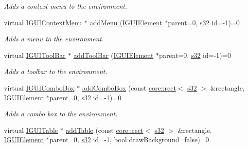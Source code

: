 \begin{DoxyCompactItemize}
\begin{DoxyCompactList}\small\item\em Adds a context menu to the environment. \end{DoxyCompactList}\item 
virtual \hyperlink{classirr_1_1gui_1_1IGUIContextMenu}{I\+G\+U\+I\+Context\+Menu} $\ast$ \hyperlink{classirr_1_1gui_1_1IGUIEnvironment_a0bed2ddf6c422117285f9602c8afd4a1}{add\+Menu} (\hyperlink{classirr_1_1gui_1_1IGUIElement}{I\+G\+U\+I\+Element} $\ast$parent=0, \hyperlink{namespaceirr_ac66849b7a6ed16e30ebede579f9b47c6}{s32} id=-\/1)=0
\begin{DoxyCompactList}\small\item\em Adds a menu to the environment. \end{DoxyCompactList}\item 
virtual \hyperlink{classirr_1_1gui_1_1IGUIToolBar}{I\+G\+U\+I\+Tool\+Bar} $\ast$ \hyperlink{classirr_1_1gui_1_1IGUIEnvironment_aa25084f8d939ca49b503162fd3370eae}{add\+Tool\+Bar} (\hyperlink{classirr_1_1gui_1_1IGUIElement}{I\+G\+U\+I\+Element} $\ast$parent=0, \hyperlink{namespaceirr_ac66849b7a6ed16e30ebede579f9b47c6}{s32} id=-\/1)=0
\begin{DoxyCompactList}\small\item\em Adds a toolbar to the environment. \end{DoxyCompactList}\item 
virtual \hyperlink{classirr_1_1gui_1_1IGUIComboBox}{I\+G\+U\+I\+Combo\+Box} $\ast$ \hyperlink{classirr_1_1gui_1_1IGUIEnvironment_a24c178560277c21d3d2e3c9ba1196d2f}{add\+Combo\+Box} (const \hyperlink{classirr_1_1core_1_1rect}{core\+::rect}$<$ \hyperlink{namespaceirr_ac66849b7a6ed16e30ebede579f9b47c6}{s32} $>$ \&rectangle, \hyperlink{classirr_1_1gui_1_1IGUIElement}{I\+G\+U\+I\+Element} $\ast$parent=0, \hyperlink{namespaceirr_ac66849b7a6ed16e30ebede579f9b47c6}{s32} id=-\/1)=0
\begin{DoxyCompactList}\small\item\em Adds a combo box to the environment. \end{DoxyCompactList}\item 
virtual \hyperlink{classirr_1_1gui_1_1IGUITable}{I\+G\+U\+I\+Table} $\ast$ \hyperlink{classirr_1_1gui_1_1IGUIEnvironment_a6c4a058d7c6ff21f062b5fe540ca4748}{add\+Table} (const \hyperlink{classirr_1_1core_1_1rect}{core\+::rect}$<$ \hyperlink{namespaceirr_ac66849b7a6ed16e30ebede579f9b47c6}{s32} $>$ \&rectangle, \hyperlink{classirr_1_1gui_1_1IGUIElement}{I\+G\+U\+I\+Element} $\ast$parent=0, \hyperlink{namespaceirr_ac66849b7a6ed16e30ebede579f9b47c6}{s32} id=-\/1, bool draw\+Background=false)=0

\end{DoxyCompactItemize}
